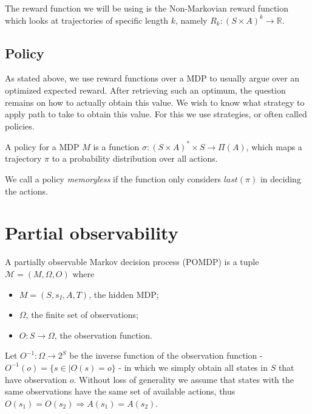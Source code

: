 The reward function we will be using is the Non-Markovian reward function which looks at trajectories of specific length $k$, namely $R_k:(S\times A)^k\to\mathbb{R}$. 



\subsection*{Policy}
As stated above, we use reward functions over a MDP to usually argue over an optimized expected reward. After retrieving such an optimum, the question remains on how to actually obtain this value. We wish to know what strategy to apply path to take to obtain this value. For this we use strategies, or often called policies. 

\begin{definition}
	A policy for a MDP $M$ is a function $\sigma:(S\times A)^*\times S \to \Pi(A)$, which maps a trajectory $\pi$ to a probability distribution over all actions. 
\end{definition}

We call a policy \textit{memoryless} if the function only considers $last(\pi)$ in deciding the actions. 


\section{Partial observability}

\begin{definition}[POMDP]
	A partially observable Markov decision process (POMDP) is a tuple $\mathcal{M}=(M, \Omega, O)$ where 
	\begin{itemize}
		\item $M=(S,s_I,A,T)$, the hidden MDP;
		\item $\Omega$, the finite set of observations;
		\item $O:S\to \Omega$, the observation function. %
	\end{itemize}
\end{definition}

Let $O^{-1}:\Omega\to 2^S$ be the inverse function of the observation function - $O^{-1}(o)=\{s\in \mid O(s)=o\}$ - in which we simply obtain all states in $S$ that have observation $o$.
Without loss of generality we assume that states with the same observations have the same set of available actions, thus $O(s_1)=O(s_2)\Rightarrow A(s_1)=A(s_2)$.

